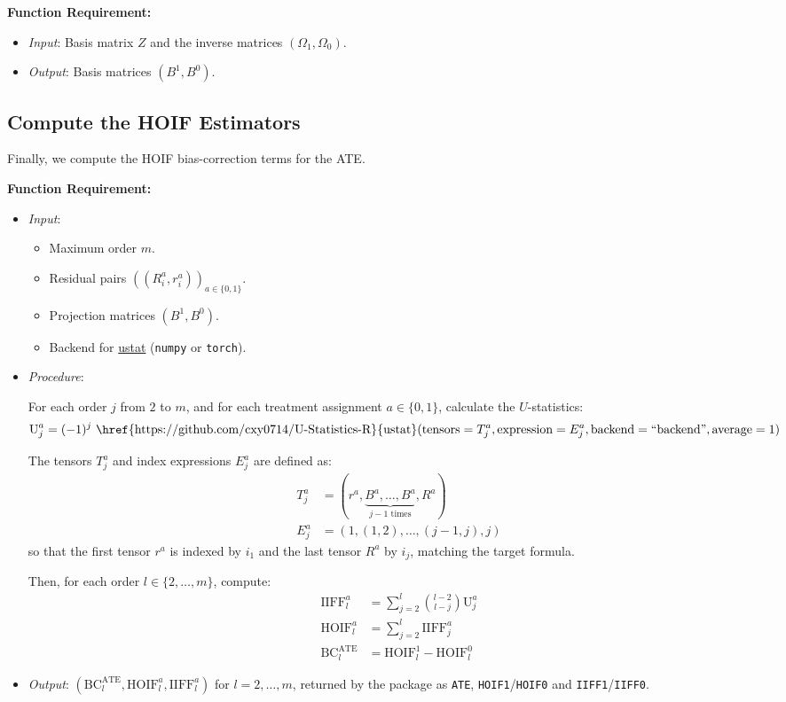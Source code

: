\documentclass[12pt]{article}
\newcommand{\ustat}{\href{https://github.com/cxy0714/U-Statistics-R}{\textrm{ustat}}}
\begin{document}
\textbf{Function Requirement:}
\begin{itemize}
  \item \textit{Input}: Basis matrix $Z$ and the inverse matrices $(\Omega_1, \Omega_0)$.
  \item \textit{Output}: Basis matrices $(B^1, B^0)$.
\end{itemize}

\subsection{Compute the HOIF Estimators}

Finally, we compute the HOIF bias-correction terms for the ATE.

\textbf{Function Requirement:}
\begin{itemize}
  \item \textit{Input}:
  \begin{itemize}
    \item Maximum order $m$.
    \item Residual pairs $((R_i^a, r_i^a))_{a \in \{0,1\}}$.
    \item Projection matrices $(B^1, B^0)$.
    \item Backend for \ustat{} (\texttt{numpy} or \texttt{torch}).
  \end{itemize}

  \item \textit{Procedure}:

  For each order $j$ from $2$ to $m$, and for each treatment assignment $a \in \{0,1\}$, calculate the $U$-statistics:
  \begin{equation}
    \text{U}_j^{a} = (-1)^j \text{ \ustat}(\text{tensors} = T_j^a, \text{expression} = E_j^a, \text{backend} = \text{``backend''}, \text{average} = 1)
  \end{equation}

  The tensors $T_j^a$ and index expressions $E_j^a$ are defined as:
  \begin{align*}
    T_j^a &= (r^a, \underbrace{B^a, \ldots, B^a}_{j-1 \text{ times}}, R^a) \\
    E_j^a &= (1, (1,2), \ldots, (j-1, j), j)
  \end{align*}
  so that the first tensor $r^a$ is indexed by $i_1$ and the last tensor $R^a$ by $i_j$, matching the target formula.

  Then, for each order $l \in \{2, \ldots, m\}$, compute:
  \begin{align*}
    \text{IIFF}_l^a &= \sum_{j=2}^{l} \binom{l-2}{l-j} \text{U}_j^{a} \\
    \text{HOIF}_l^a &= \sum_{j=2}^{l} \text{IIFF}_j^a \\
    \mathrm{BC}^{\mathrm{ATE}}_l &= \text{HOIF}_l^1 - \text{HOIF}_l^0
  \end{align*}

  \item \textit{Output}: $(\mathrm{BC}^{\mathrm{ATE}}_l, \text{HOIF}_l^a, \text{IIFF}_l^a)$ for $l = 2, \ldots, m$, returned by the package as \texttt{ATE}, \texttt{HOIF1}/\texttt{HOIF0} and \texttt{IIFF1}/\texttt{IIFF0}.
\end{itemize}



\end{document}
